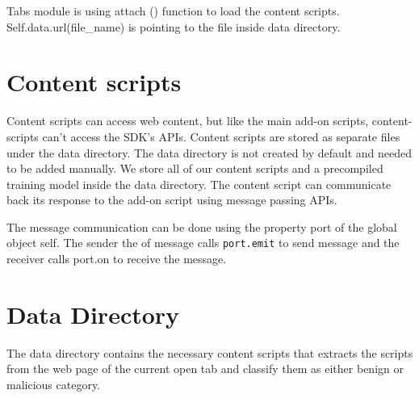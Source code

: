 Tabs module is using attach () function to load the content scripts. Self.data.url(file\_name) is pointing to the file inside data directory.

\section{Content scripts}

Content scripts can access web content, but like the main add-on scripts, content-scripts can't access the SDK's APIs. Content scripts are stored as separate files under the data directory. The data directory is not created by default and needed to be added manually. We store all of our content scripts and a precompiled training model inside the data directory.  The content script can communicate back its response to the add-on script using message passing APIs.

The message communication can be done using the property port of the global object self. The sender the of message calls \texttt {port.emit} to send message and the receiver calls port.on to receive the message.

\section{Data Directory}

The data directory contains the necessary content scripts that extracts the scripts from the web page of the current open tab and classify them as either benign or malicious category. 

